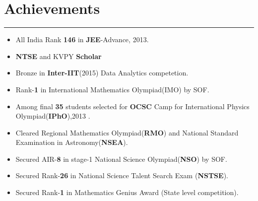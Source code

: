 \documentclass[a4paper]{article}
\begin{document}
 \section*{Achievements}
 \hrule
 \vspace{3mm}
  \begin{itemize}
   \item All India Rank \textbf{146} in \textbf{JEE}-Advance, 2013.	
   \item \textbf{NTSE} and KVPY \textbf{Scholar} 
   \item Bronze in \textbf{Inter-IIT}(2015) Data Analytics competetion.
   \item Rank-\textbf{1} in International Mathematics Olympiad(IMO) by SOF.
   \item Among final \textbf{35} students selected for \textbf{OCSC} Camp for International Physics Olympiad(\textbf{IPhO}),2013 .
   \item Cleared Regional Mathematics Olympiad(\textbf{RMO}) and National Standard Examination in Astronomy(\textbf{NSEA}).
   \item Secured AIR-\textbf{8} in stage-1 National Science Olympiad(\textbf{NSO}) by SOF.
   \item Secured Rank-\textbf{26} in National Science Talent Search Exam (\textbf{NSTSE}).
   \item Secured Rank-\textbf{1} in Mathematics Genius Award (State level competition).  
  \end{itemize}
 
 
\end{document}
